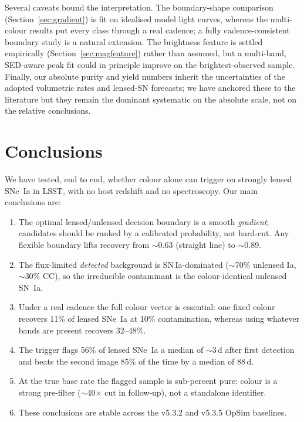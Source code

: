 \documentclass[fleqn,usenatbib]{mnras}
\begin{document}
Several caveats bound the interpretation. The boundary-shape comparison
(Section~\ref{sec:gradient}) is fit on idealised model light curves, whereas the
multi-colour results put every class through a real cadence; a fully
cadence-consistent boundary study is a natural extension. The brightness feature
is settled empirically (Section~\ref{sec:magfeature}) rather than assumed, but a
multi-band, SED-aware peak fit could in principle improve on the brightest-observed
sample. Finally, our absolute purity and yield numbers inherit the uncertainties
of the adopted volumetric rates and lensed-SN forecasts; we have anchored these
to the literature but they remain the dominant systematic on the absolute scale,
not on the relative conclusions.

\section{Conclusions}
\label{sec:conclusions}

We have tested, end to end, whether colour alone can trigger on strongly lensed
SNe~Ia in LSST, with no host redshift and no spectroscopy. Our main conclusions
are:

\begin{enumerate}
  \item The optimal lensed/unlensed decision boundary is a smooth
  \emph{gradient}; candidates should be ranked by a calibrated probability, not
  hard-cut. Any flexible boundary lifts recovery from $\sim$0.63 (straight line)
  to $\sim$0.89.
  \item The flux-limited \emph{detected} background is SN\,Ia-dominated
  ($\sim$70\% unlensed Ia, $\sim$30\% CC), so the irreducible contaminant is the
  colour-identical unlensed SN~Ia.
  \item Under a real cadence the full colour vector is essential: one fixed colour
  recovers 11\% of lensed SNe~Ia at 10\% contamination, whereas using whatever
  bands are present recovers 32--48\%.
  \item The trigger flags 56\% of lensed SNe~Ia a median of $\sim$3\,d after first
  detection and beats the second image 85\% of the time by a median of 88\,d.
  \item At the true base rate the flagged sample is sub-percent pure: colour is a
  strong pre-filter ($\sim$40$\times$ cut in follow-up), not a standalone
  identifier.
  \item These conclusions are stable across the v5.3.2 and v5.3.5 OpSim baselines.
\end{enumerate}
\end{document}

